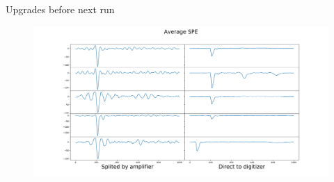 \documentclass{beamer}
\begin{document}
\begin{frame}{Upgrades before next run}
\begin{figure}[h]
  \includegraphics[width=\linewidth]{SPEs.png}
\end{figure}
\end{frame}
\end{document}
